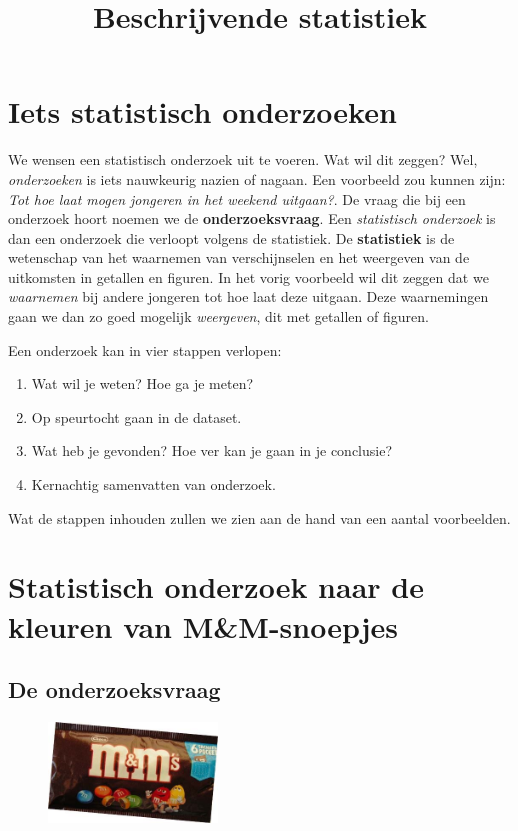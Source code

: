 \documentclass[11pt]{article}
\title{\Huge Beschrijvende statistiek}
\date{}
\begin{document}
\maketitle
\vspace*{-2cm}

\section{Iets statistisch onderzoeken}

We wensen een statistisch onderzoek uit te voeren. Wat wil dit zeggen? Wel, {\it onderzoeken} is iets nauwkeurig nazien of nagaan. Een voorbeeld zou kunnen zijn: {\it Tot hoe laat mogen jongeren in het weekend uitgaan?}. De vraag die bij een onderzoek hoort noemen we de {\bf onderzoeksvraag}. Een {\it statistisch onderzoek} is dan een onderzoek die verloopt volgens de statistiek. De {\bf statistiek} is de wetenschap van het waarnemen van verschijnselen en het weergeven van de uitkomsten in getallen en figuren. In het vorig voorbeeld wil dit zeggen dat we {\it waarnemen} bij andere jongeren tot hoe laat deze uitgaan. Deze waarnemingen gaan we dan zo goed mogelijk {\it weergeven}, dit met getallen of figuren.

Een onderzoek kan in vier stappen verlopen:
\begin{enumerate}
  \item Wat wil je weten? Hoe ga je meten?
  \item Op speurtocht gaan in de dataset.
  \item Wat heb je gevonden? Hoe ver kan je gaan in je conclusie?
  \item Kernachtig samenvatten van onderzoek.
\end{enumerate}

Wat de stappen inhouden zullen we zien aan de hand van een aantal voorbeelden.

\section{Statistisch onderzoek naar de kleuren van M\&M-snoepjes}

\subsection{De onderzoeksvraag}

\begin{figure}
  \includegraphics[width=0.4\textwidth]{MenM-verpakking.png}
\end{figure}
\end{document}
